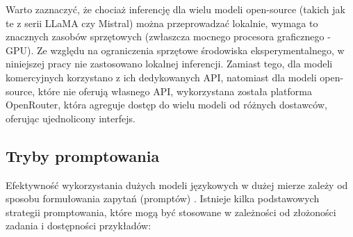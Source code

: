 Warto zaznaczyć, że chociaż inferencję dla wielu modeli open-source (takich jak te z serii LLaMA czy Mistral) można przeprowadzać lokalnie, wymaga to znacznych zasobów sprzętowych (zwłaszcza mocnego procesora graficznego - GPU). Ze względu na ograniczenia sprzętowe środowiska eksperymentalnego, w niniejszej pracy nie zastosowano lokalnej inferencji. Zamiast tego, dla modeli komercyjnych korzystano z ich dedykowanych API, natomiast dla modeli open-source, które nie oferują własnego API, wykorzystana została platforma OpenRouter, która agreguje dostęp do wielu modeli od różnych dostawców, oferując ujednolicony interfejs.

\subsection{Tryby promptowania}

Efektywność wykorzystania dużych modeli językowych w dużej mierze zależy od sposobu formułowania zapytań (promptów) \cite{kratzke_dont_2024}. Istnieje kilka podstawowych strategii promptowania, które mogą być stosowane w zależności od złożoności zadania i dostępności przykładów:

